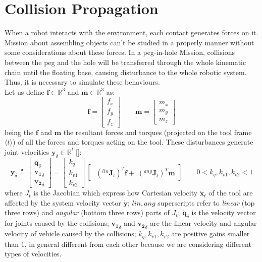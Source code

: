 \section{Collision Propagation}
\label{sec:forceConsideration}
When a robot interacts with the environment, each contact generates forces on it. Mission about assembling objects can't be studied in a properly manner without some considerations about these forces. In a peg-in-hole Mission, collisions between the peg and the hole will be transferred through the whole kinematic chain until the floating base, causing disturbance to the whole robotic system. Thus, it is necessary to simulate these behaviours.\\ 

Let us define $\boldsymbol{f} \in \mathbb{R}^3$ and $\boldsymbol{m} \in \mathbb{R}^3$ as:
\begin{equation}
\boldsymbol{f} = \begin{bmatrix}f_x \\ f_y \\ f_z\end{bmatrix} \qquad
\boldsymbol{m} = \begin{bmatrix}m_x \\ m_y \\ m_z\end{bmatrix}
\end{equation}
being the $\boldsymbol{f}$ and $\boldsymbol{m}$ the resultant forces and torques (projected on the tool frame $ \langle t \rangle $) of all the forces and torques acting on the tool. These disturbances generate joint velocities $ \dot{\boldsymbol{y}}_{\delta} \in \mathbb{R}^l$ [\cite{bookSiciliano}]:
\begin{equation}
	\label{eq:forTor}
	\dot{\boldsymbol{y}}_{\delta} \triangleq 
	\begin{bmatrix} \dot{\boldsymbol{q}}_{\delta} \\ \boldsymbol{v_1}_{\delta} \\ \boldsymbol{v_2}_{\delta} \end{bmatrix}
	= \begin{bmatrix} k_q \\ k_{v1} \\ k_{v2} \end{bmatrix} \, \begin{bmatrix}\;(^{lin}\boldsymbol{J}_t)^T \boldsymbol{f} + \;(^{ang}\boldsymbol{J}_t)^T \boldsymbol{m}\end{bmatrix} 
	\qquad 0 < k_q, k_{v1}, k_{v2} < 1 
\end{equation}
where $J_t$ is the Jacobian which express how Cartesian velocity $\dot{\boldsymbol{x}}_t$ of the tool are affected by the system velocity vector  $\dot{\boldsymbol{y}}$; $lin, ang$ superscripts refer to \textit{linear} (top three rows) and \textit{angular} (bottom three rows) parts of $J_t$; $\dot{\boldsymbol{q}}_{\delta}$ is the velocity vector for joints caused by the collisions; $\boldsymbol{v_1}_{\delta}$ and $\boldsymbol{v_2}_{\delta}$  are the linear velocity and angular velocity of vehicle caused by the collisions; $k_q, k_{v1}, k_{v2}$ are positive gains smaller than $1$, in general different from each other  because we are considering different types of velocities.\\


